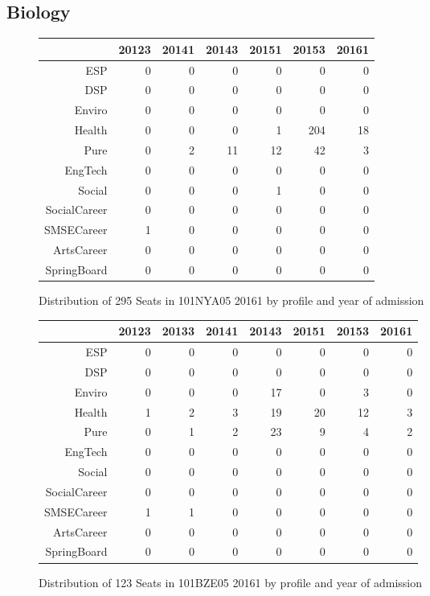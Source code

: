 \documentclass{article}\usepackage[]{graphicx}\usepackage[]{color}
\begin{document}
\subsection{Biology}
\begin{figure}[H]
\centering
\begin{tabular}{rrrrrrr}
  \hline
 & 20123 & 20141 & 20143 & 20151 & 20153 & 20161 \\ 
  \hline
ESP &   0 &   0 &   0 &   0 &   0 &   0 \\ 
  DSP &   0 &   0 &   0 &   0 &   0 &   0 \\ 
  Enviro &   0 &   0 &   0 &   0 &   0 &   0 \\ 
  Health &   0 &   0 &   0 &   1 & 204 &  18 \\ 
  Pure &   0 &   2 &  11 &  12 &  42 &   3 \\ 
  EngTech &   0 &   0 &   0 &   0 &   0 &   0 \\ 
  Social &   0 &   0 &   0 &   1 &   0 &   0 \\ 
  SocialCareer &   0 &   0 &   0 &   0 &   0 &   0 \\ 
  SMSECareer &   1 &   0 &   0 &   0 &   0 &   0 \\ 
  ArtsCareer &   0 &   0 &   0 &   0 &   0 &   0 \\ 
  SpringBoard &   0 &   0 &   0 &   0 &   0 &   0 \\ 
   \hline
\end{tabular}
\caption{Distribution of 295 Seats in 101NYA05 20161 by profile and year of admission} 
\end{figure}
\begin{figure}[H]
\centering
\begin{tabular}{rrrrrrrr}
  \hline
 & 20123 & 20133 & 20141 & 20143 & 20151 & 20153 & 20161 \\ 
  \hline
ESP &   0 &   0 &   0 &   0 &   0 &   0 &   0 \\ 
  DSP &   0 &   0 &   0 &   0 &   0 &   0 &   0 \\ 
  Enviro &   0 &   0 &   0 &  17 &   0 &   3 &   0 \\ 
  Health &   1 &   2 &   3 &  19 &  20 &  12 &   3 \\ 
  Pure &   0 &   1 &   2 &  23 &   9 &   4 &   2 \\ 
  EngTech &   0 &   0 &   0 &   0 &   0 &   0 &   0 \\ 
  Social &   0 &   0 &   0 &   0 &   0 &   0 &   0 \\ 
  SocialCareer &   0 &   0 &   0 &   0 &   0 &   0 &   0 \\ 
  SMSECareer &   1 &   1 &   0 &   0 &   0 &   0 &   0 \\ 
  ArtsCareer &   0 &   0 &   0 &   0 &   0 &   0 &   0 \\ 
  SpringBoard &   0 &   0 &   0 &   0 &   0 &   0 &   0 \\ 
   \hline
\end{tabular}
\caption{Distribution of 123 Seats in 101BZE05 20161 by profile and year of admission} 
\end{figure}
\end{document}
